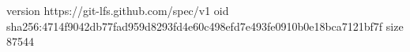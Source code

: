 version https://git-lfs.github.com/spec/v1
oid sha256:4714f9042db77fad959d8293fd4e60c498efd7e493fe0910b0e18bca7121bf7f
size 87544
